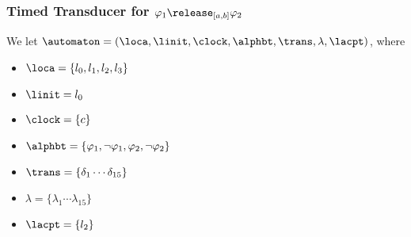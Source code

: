 \subsubsection{Timed Transducer for $\varphi_1\release_{[a,b]}\varphi_2$}       
        We let $\automaton=(\loca,\linit,\clock,\allowbreak\alphbt,\trans, \lambda, \lacpt)$, where
        \begin{itemize}
            \item $\loca=\{l_0, l_1, l_2, l_3\}$ 
            
            \item $\linit=l_0$ 
            
            \item $\clock=\{c\}$
            
            \item $\allowbreak\alphbt=\{\varphi_1, \neg \varphi_1, \varphi_2, \neg \varphi_2\}$
            
            \item $\trans=\{ \delta_1 \cdots \delta_{15} \}$
            

            
            \item $\lambda=\{\lambda_1 \cdots \lambda_{15}\}$
            \item $\lacpt=\{l_2\}$
        \end{itemize}

